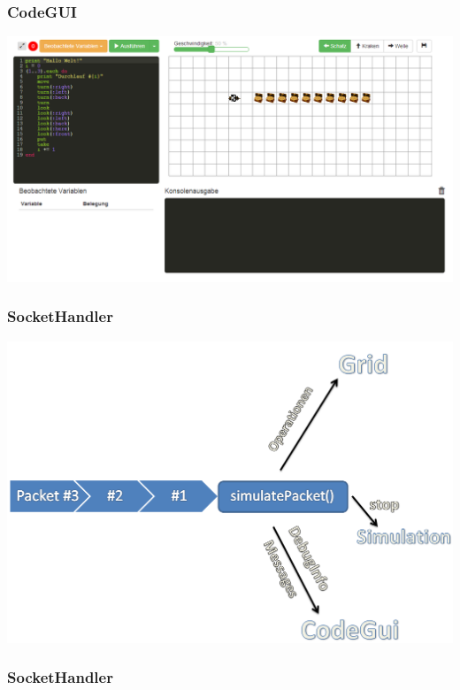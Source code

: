\begin{frame}
\frametitle{CodeGUI}
\begin{center}
	\includegraphics[scale=0.35]{client/client}
\end{center}
\end{frame}

\begin{frame}
\frametitle{SocketHandler}
	\includegraphics[scale=0.37]{client/socket-queue.PNG}
\end{frame}

\begin{frame}
\frametitle{SocketHandler}
\inputminted[linenos, numbersep=2pt, tabsize=4, frame=lines, label=Beispiel Paket]{json}{client/packet.json}
\end{frame}
